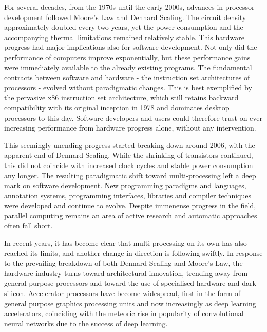     For several decades, from the 1970s until the early 2000s, advances in
    processor development followed Moore's Law and Dennard Scaling.
    The circuit density approximately doubled every two years, yet the power
    consumption and the accompanying thermal limitations remained relatively
    stable.
    This hardware progress had major implications also for software
    development.
    Not only did the performance of computers improve exponentially, but these
    performance gains were immediately available to the already existing
    programs.
    The fundamental contracts between software and hardware - the
    instruction set architectures of processors - evolved without paradigmatic
    changes.
    This is best exemplified by the pervasive x86 instruction set architecture,
    which still retains backward compatibility with its original inception in
    1978 and dominates desktop processors to this day.
    Software developers and users could therefore trust on ever increasing
    performance from hardware progress alone, without any intervention.

    This seemingly unending progress started breaking down around 2006,
    with the apparent end of Dennard Scaling.
    While the shrinking of transistors continued, this did not coincide with
    increased clock cycles and stable power consumption any longer.
    The resulting paradigmatic shift toward multi-processing left a deep mark on
    software development.
    New programming paradigms and languages, annotation systems, programming
    interfaces, libraries and compiler techniques were developed and continue to
    evolve.
    Despite immenense progress in the field, parallel computing remains an area
    of active research and automatic approaches often fall short.

    In recent years, it has become clear that multi-processing on its own has
    also reached its limits, and another change in direction is following
    swiftly.
    In response to the prevailing breakdown of both Dennard Scaling and Moore's
    Law, the hardware industry turns toward architectural innovation, trending
    away from general purpose processors and toward the use of specialised
    hardware and dark silicon.
    Accelerator processors have become widespread, first in the form of general
    purpose graphics processing units and now increasingly as deep learning
    accelerators, coinciding with the meteoric rise in popularity of
    convolutional neural networks due to the success of deep learning.

